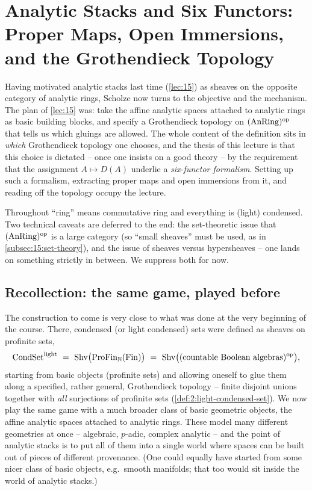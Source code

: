 \section{Analytic Stacks and Six Functors: Proper Maps, Open Immersions, and the Grothendieck Topology}
\label{lec:16}

Having motivated analytic stacks last time (\cref{lec:15}) as sheaves on the
opposite category of analytic rings, Scholze now turns to the objective and the
mechanism. The plan of \cref{lec:15} was: take the affine analytic spaces attached
to analytic rings as basic building blocks, and specify a Grothendieck topology on
$(\operatorname{AnRing})^{\mathrm{op}}$ that tells us which gluings are allowed. The whole content
of the definition sits in \emph{which} Grothendieck topology one chooses, and the
thesis of this lecture is that this choice is dictated -- once one insists on a
good theory -- by the requirement that the assignment $A\mapsto D(A)$ underlie a
\emph{six-functor formalism}. Setting up such a formalism, extracting proper maps
and open immersions from it, and reading off the topology occupy the lecture.

Throughout ``ring'' means commutative ring and everything is (light) condensed.
Two technical caveats are deferred to the end: the set-theoretic issue that
$(\operatorname{AnRing})^{\mathrm{op}}$ is a large category (so ``small sheaves'' must be used, as
in \cref{subsec:15:set-theory}), and the issue of sheaves versus hypersheaves --
one lands on something strictly in between. We suppress both for now.

\subsection{Recollection: the same game, played before}
\label{subsec:16:recollection}

\begin{remark}
\label{rmk:16:analogy}
The construction to come is very close to what was done at the very beginning of
the course. There, condensed (or light condensed) sets were defined as sheaves on
profinite sets,
\begin{equation*}
\CondSetl\ =\ \mathrm{Shv}\bigl(\ProFin_{\mathbb{N}}(\mathrm{Fin})\bigr)
\ =\ \mathrm{Shv}\bigl((\text{countable Boolean algebras})^{\mathrm{op}}\bigr),
\end{equation*}
starting from basic objects (profinite sets) and allowing oneself to glue them
along a specified, rather general, Grothendieck topology -- finite disjoint unions
together with \emph{all} surjections of profinite sets (\cref{def:2:light-condensed-set}).
We now play the same game with a much broader class of basic geometric objects, the
affine analytic spaces attached to analytic rings. These model many different
geometries at once -- algebraic, $p$-adic, complex analytic -- and the point of
analytic stacks is to put all of them into a single world where spaces can be built
out of pieces of different provenance. (One could equally have started from some
nicer class of basic objects, e.g.\ smooth manifolds; that too would sit inside the
world of analytic stacks.)
\end{remark}

